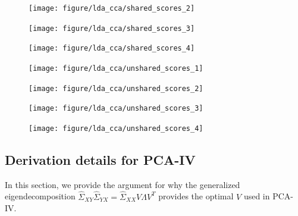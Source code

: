 \documentclass{article}
\begin{document}
\begin{figure}[ht]
  \centering
  \texttt{[image: figure/lda\_cca/shared\_scores\_2]}
  \caption{\label{fig:lda_cca_shared_scores_2} }
\end{figure}

\begin{figure}[ht]
  \centering
  \texttt{[image: figure/lda\_cca/shared\_scores\_3]}
  \caption{\label{fig:lda_cca_shared_scores_3} }
\end{figure}

\begin{figure}[ht]
  \centering
  \texttt{[image: figure/lda\_cca/shared\_scores\_4]}
  \caption{\label{fig:lda_cca_shared_scores_4} }
\end{figure}

\begin{figure}[ht]
  \centering
  \texttt{[image: figure/lda\_cca/unshared\_scores\_1]}
  \caption{\label{fig:lda_cca_unshared_scores_1} }
\end{figure}

\begin{figure}[ht]
  \centering
  \texttt{[image: figure/lda\_cca/unshared\_scores\_2]}
  \caption{\label{fig:lda_cca_unshared_scores_2} }
\end{figure}

\begin{figure}[ht]
  \centering
  \texttt{[image: figure/lda\_cca/unshared\_scores\_3]}
  \caption{\label{fig:lda_cca_unshared_scores_3} }
\end{figure}

\begin{figure}[ht]
  \centering
  \texttt{[image: figure/lda\_cca/unshared\_scores\_4]}
  \caption{\label{fig:lda_cca_unshared_scores_4} }
\end{figure}


\subsection{Derivation details for PCA-IV}
\label{subsec:pca_iv_derivation}

In this section, we provide the argument for why the generalized
eigendecomposition $\hat{\Sigma}_{XY}\hat{\Sigma}_{YX} =
\hat{\Sigma}_{XX}V\Lambda V^{T}$ provides the optimal $V$ used in PCA-IV.
\end{document}
